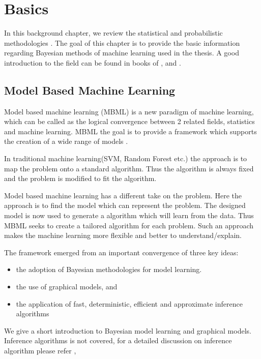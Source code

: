 

\chapter{Basics}

In this background chapter, we review the statistical and probabilistic methodologies .
The goal of this chapter is to provide the basic information regarding Bayesian methods of machine learning used in the thesis. A good introduction to the field can be found in books of \cite{bishop2007pattern}, \cite{kruschke2014doing} and \cite{lee2014bayesian} . 

\section{Model Based Machine Learning}

Model based machine learning (MBML) is a new paradigm of machine learning, which can be called as the logical convergence between 2 related fields, statistics and machine learning. MBML the goal is to provide a framework which supports the creation of a wide range of models \cite{Bishop20120222}.

In traditional machine learning(SVM, Random Forest etc.) the approach is to map the problem onto a standard algorithm. Thus the algorithm is always fixed and the problem is modified to fit the algorithm.

Model based machine learning has a different take on the problem. Here the approach is to find the model which can represent the problem. The designed model is now used to generate a algorithm which will learn from the data. Thus MBML seeks to create a tailored algorithm for each problem. Such an approach makes the machine learning more flexible and better to understand/explain.

The framework emerged from an important convergence of three key ideas:
   \begin{itemize}
	\item the adoption of Bayesian methodologies for model learning.
	\item the use of graphical models, and
	\item the application of fast, deterministic, efficient and approximate inference algorithms
\end{itemize}

We give a short introduction to Bayesian model learning and graphical models. Inference algorithms is not covered, for a detailed discussion on inference algorithm please refer \cite{beal2003variational}, \cite{minka2001family}

